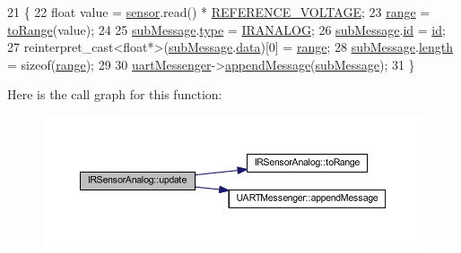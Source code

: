 \begin{DoxyCode}
21                             \{
22     \textcolor{keywordtype}{float} value = \hyperlink{class_i_r_sensor_analog_a90a5052f0d0f71bf2518fac4b5dd9dc0}{sensor}.read() * \hyperlink{_i_r_sensor_analog_8cpp_a93b7d2c4ba7f352176468cb2b3a26ebd}{REFERENCE\_VOLTAGE};
23     \hyperlink{class_i_r_sensor_analog_a7463c4bbf714764667ac9d7527ced012}{range} = \hyperlink{class_i_r_sensor_analog_a33ed6c82b3cb6720bfdd6f7598c54699}{toRange}(value);
24 
25     \hyperlink{class_i_r_sensor_analog_a6f3d8032be77b223aa78381c713197c3}{subMessage}.\hyperlink{struct_sub_message_a064f1d26d553da776dc749d37a18a499}{type} = \hyperlink{_sub_message_8h_a81f78fc173dedefe5a049c0aa3eed2c0af743186003faa7fbcb5ba26dfce5c1f4}{IRANALOG};
26     \hyperlink{class_i_r_sensor_analog_a6f3d8032be77b223aa78381c713197c3}{subMessage}.\hyperlink{struct_sub_message_af3acc450c0686d7a9d15ccd9d548cb6d}{id} = \hyperlink{class_abstract_component_a9c9c548149681b1a1dd935e66ed5dd11}{id};
27     \textcolor{keyword}{reinterpret\_cast<}\textcolor{keywordtype}{float}*\textcolor{keyword}{>}(\hyperlink{class_i_r_sensor_analog_a6f3d8032be77b223aa78381c713197c3}{subMessage}.\hyperlink{struct_sub_message_a7d923c5cdaa380c27d7c4cf60ea7c1be}{data})[0] = \hyperlink{class_i_r_sensor_analog_a7463c4bbf714764667ac9d7527ced012}{range};
28     \hyperlink{class_i_r_sensor_analog_a6f3d8032be77b223aa78381c713197c3}{subMessage}.\hyperlink{struct_sub_message_a276e06f5335ca7857c21ac8c0e51bd6d}{length} = \textcolor{keyword}{sizeof}(\hyperlink{class_i_r_sensor_analog_a7463c4bbf714764667ac9d7527ced012}{range});
29 
30     \hyperlink{class_i_r_sensor_analog_abdd70ea1abffd1323989af062dab0aeb}{uartMessenger}->\hyperlink{class_u_a_r_t_messenger_ada0967869e320c236a211b405abf128a}{appendMessage}(\hyperlink{class_i_r_sensor_analog_a6f3d8032be77b223aa78381c713197c3}{subMessage});
31 \}
\end{DoxyCode}
Here is the call graph for this function\+:\nopagebreak
\begin{figure}[H]
\begin{center}
\leavevmode
\includegraphics[width=350pt]{class_i_r_sensor_analog_a919942de7c5fc3af5da9a2b32e31d328_cgraph}
\end{center}
\end{figure}


